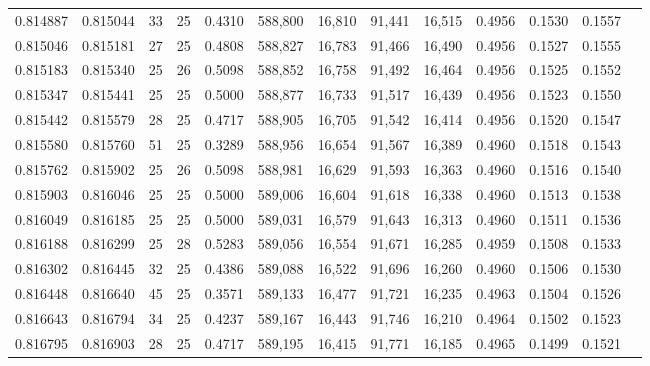 \begin{tabular}{rrrrrrrrrrrrr}
0.814887 & 0.815044 &    33 &  25 &                                     0.4310 & 588,800 &  16,810 &  91,441 &  16,515 & 0.4956 & 0.1530 & 0.1557 \\
0.815046 & 0.815181 &    27 &  25 &                                     0.4808 & 588,827 &  16,783 &  91,466 &  16,490 & 0.4956 & 0.1527 & 0.1555 \\
0.815183 & 0.815340 &    25 &  26 &                                     0.5098 & 588,852 &  16,758 &  91,492 &  16,464 & 0.4956 & 0.1525 & 0.1552 \\
0.815347 & 0.815441 &    25 &  25 &                                     0.5000 & 588,877 &  16,733 &  91,517 &  16,439 & 0.4956 & 0.1523 & 0.1550 \\
0.815442 & 0.815579 &    28 &  25 &                                     0.4717 & 588,905 &  16,705 &  91,542 &  16,414 & 0.4956 & 0.1520 & 0.1547 \\
0.815580 & 0.815760 &    51 &  25 &                                     0.3289 & 588,956 &  16,654 &  91,567 &  16,389 & 0.4960 & 0.1518 & 0.1543 \\
0.815762 & 0.815902 &    25 &  26 &                                     0.5098 & 588,981 &  16,629 &  91,593 &  16,363 & 0.4960 & 0.1516 & 0.1540 \\
0.815903 & 0.816046 &    25 &  25 &                                     0.5000 & 589,006 &  16,604 &  91,618 &  16,338 & 0.4960 & 0.1513 & 0.1538 \\
0.816049 & 0.816185 &    25 &  25 &                                     0.5000 & 589,031 &  16,579 &  91,643 &  16,313 & 0.4960 & 0.1511 & 0.1536 \\
0.816188 & 0.816299 &    25 &  28 &                                     0.5283 & 589,056 &  16,554 &  91,671 &  16,285 & 0.4959 & 0.1508 & 0.1533 \\
0.816302 & 0.816445 &    32 &  25 &                                     0.4386 & 589,088 &  16,522 &  91,696 &  16,260 & 0.4960 & 0.1506 & 0.1530 \\
0.816448 & 0.816640 &    45 &  25 &                                     0.3571 & 589,133 &  16,477 &  91,721 &  16,235 & 0.4963 & 0.1504 & 0.1526 \\
0.816643 & 0.816794 &    34 &  25 &                                     0.4237 & 589,167 &  16,443 &  91,746 &  16,210 & 0.4964 & 0.1502 & 0.1523 \\
0.816795 & 0.816903 &    28 &  25 &                                     0.4717 & 589,195 &  16,415 &  91,771 &  16,185 & 0.4965 & 0.1499 & 0.1521 \\

\end{tabular}
